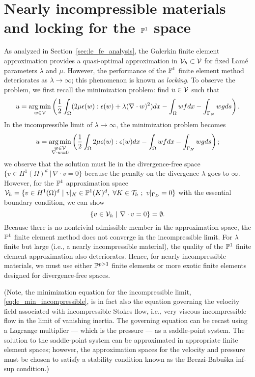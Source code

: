 \section{Nearly incompressible materials and locking for the $\mathbb{P}^1$ space}
As analyzed in Section~\ref{sec:le_fe_analysis}, the Galerkin finite element approximation provides a quasi-optimal approximation in $\mathcal{V}_h \subset \mathcal{V}$ for fixed Lam\'e parameters $\lambda$ and $\mu$.  However, the performance of the $\mathbb{P}^1$ finite element method deteriorates as $\lambda \to \infty$; this phenomenon is known as \emph{locking}. To observe the problem, we first recall the minimization problem: find $u \in \mathcal{V}$ such that 
\begin{equation*}
  u = \operatorname*{arg\,min}_{w \in \mathcal{V}} \left( \frac{1}{2}  \int_{\Omega}  ( 2 \mu \epsilon(w) : \epsilon(w) + \lambda (\nabla \cdot w)^2 ) dx - \int_{\Omega} w f dx - \int_{\Gamma_N} w g ds \right).
\end{equation*}
In the incompressible limit of $\lambda \to \infty$, the minimization problem becomes
\begin{equation}
  u = \operatorname*{arg\,min}_{\substack{w \in \mathcal{V} \\ \nabla \cdot w = 0}} \left( \frac{1}{2}  \int_{\Omega}   2 \mu \epsilon(w) : \epsilon(w)  dx - \int_{\Omega} w f dx - \int_{\Gamma_N} w g ds \right);
  \label{eq:le_min_incompressible}
\end{equation}
we observe that the solution must lie in the divergence-free space $\{ v \in H^1(\Omega)^d \ | \ \nabla \cdot v = 0 \}$ because the penalty on the divergence $\lambda$ goes to $\infty$.  However, for the $\mathbb{P}^1$ approximation space $\calV_h = \{ v \in H^1(\Omega)^d \ | \ v|_K \in \PP^1(K)^d, \ \forall K \in \calT_h \ ; \ v|_{\Gamma_D} = 0 \}$ with the essential boundary condition, we can show 
\begin{equation*}
  \{ v \in \mathcal{V}_h \ | \ \nabla \cdot v = 0 \} = \emptyset.
\end{equation*}
Because there is no nontrivial admissible member in the approximation space, the $\mathbb{P}^1$ finite element method does not converge in the incompressible limit. For $\lambda$ finite but large (i.e., a nearly incompressible material), the quality of the $\mathbb{P}^1$ finite element approximation also deteriorates. Hence, for nearly incompressible materials, we must use either $\mathbb{P}^{p > 1}$ finite elements or more exotic finite elements designed for divergence-free spaces.

(Note, the minimization equation for the incompressible limit, \eqref{eq:le_min_incompressible}, is in fact also the equation governing the velocity field associated with incompressible Stokes flow, i.e., very viscous incompressible flow in the limit of vanishing inertia. The governing equation can be recast using a Lagrange multiplier --- which is the pressure --- as a saddle-point system. The solution to the saddle-point system can be approximated in appropriate finite element spaces; however, the approximation spaces for the velocity and pressure must be chosen to satisfy a stability condition known as the Brezzi-Babu\v{s}ka inf-sup condition.) 

